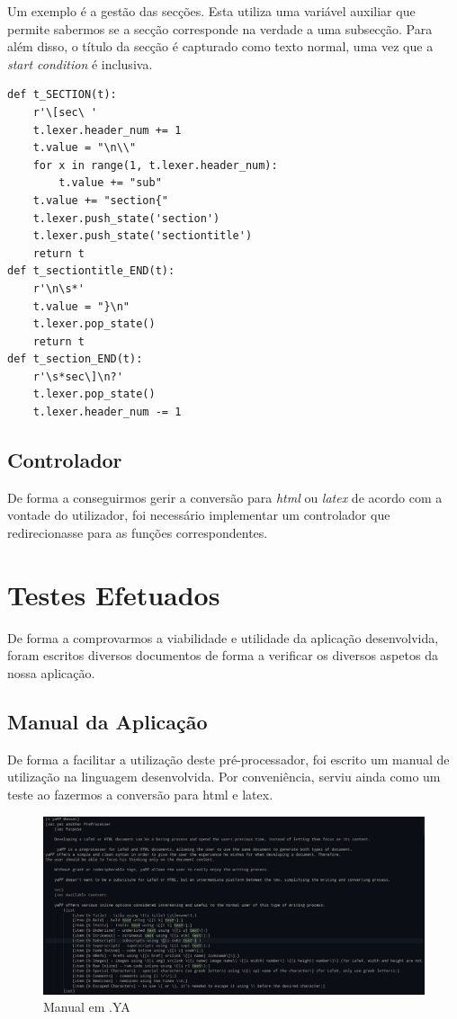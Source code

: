 \documentclass{article}
\begin{document}
 Um exemplo é a gestão das secções. Esta utiliza uma variável auxiliar que permite sabermos se a secção corresponde na verdade a uma subsecção. Para além disso, o título da secção é capturado como texto normal, uma vez que a \textit{start condition} é inclusiva.\\
 \begin{verbatim}
def t_SECTION(t):
    r'\[sec\ '
    t.lexer.header_num += 1
    t.value = "\n\\"
    for x in range(1, t.lexer.header_num):
        t.value += "sub"
    t.value += "section{"
    t.lexer.push_state('section')
    t.lexer.push_state('sectiontitle')
    return t
def t_sectiontitle_END(t):
    r'\n\s*'
    t.value = "}\n"
    t.lexer.pop_state()
    return t
def t_section_END(t):
    r'\s*sec\]\n?'
    t.lexer.pop_state()
    t.lexer.header_num -= 1
\end{verbatim}
 \subsection{Controlador}
De forma a conseguirmos gerir a conversão para \textit{html} ou \textit{latex} de acordo com a vontade do utilizador, foi necessário implementar um controlador que redirecionasse para as funções correspondentes.\section{Testes Efetuados}
De forma a comprovarmos a viabilidade e utilidade da aplicação desenvolvida, foram escritos diversos documentos de forma a verificar os diversos aspetos da nossa aplicação.\\
 \subsection{Manual da Aplicação}
De forma a facilitar a utilização deste pré-processador, foi escrito um manual de utilização na linguagem desenvolvida. Por conveniência, serviu ainda como um teste ao fazermos a conversão para html e latex.\\
 
\begin{figure}[!ht]
\centering
\includegraphics[width=\textwidth]{images/manualYA.png}
\caption{Manual em .YA}
\end{figure}
\\
 
\end{document}
